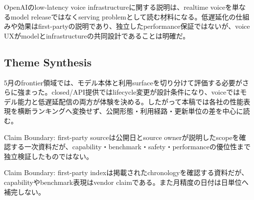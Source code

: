 OpenAIのlow-latency voice infrastructureに関する説明は、realtime voiceを単なるmodel releaseではなくserving problemとして読む材料になる。低遅延化の仕組みや効果はfirst-partyの説明であり、独立したperformance保証ではないが、voice UXがmodelとinfrastructureの共同設計であることは明確だ。\autocite{src-5c3d93bd7160}


\subsection{Theme Synthesis}

5月のfrontier領域では、モデル本体と利用surfaceを切り分けて評価する必要がさらに強まった。closed/API提供ではlifecycle変更が設計条件になり、voiceではモデル能力と低遅延配信の両方が体験を決める。したがって本稿では各社の性能表現を横断ランキングへ変換せず、公開形態・利用経路・更新単位の差を中心に読む。\autocite{src-01a8b52eee81,src-24a3c172de48,src-5c3d93bd7160,src-a24fd97eb3d0,src-dd5d9b8662f3,src-eac8dfbeb78c,src-f6aa679babd7}


\begin{claimboundary}
Claim Boundary: first-party sourceは公開日とsource ownerが説明したscopeを確認する一次資料だが、capability・benchmark・safety・performanceの優位性まで独立検証したものではない。\autocite{src-01a8b52eee81,src-24a3c172de48,src-5c3d93bd7160,src-a24fd97eb3d0,src-dd5d9b8662f3,src-eac8dfbeb78c,src-f6aa679babd7}
\end{claimboundary}

\begin{claimboundary}
Claim Boundary: first-party indexは掲載されたchronologyを確認する資料だが、capabilityやbenchmark表現はvendor claimである。また月精度の日付は日単位へ補完しない。\autocite{src-01a8b52eee81,src-24a3c172de48,src-5c3d93bd7160,src-a24fd97eb3d0,src-dd5d9b8662f3,src-eac8dfbeb78c,src-f6aa679babd7}
\end{claimboundary}
